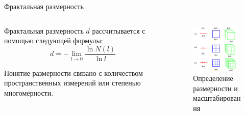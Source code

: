 \documentclass{beamer}
\begin{document}
\begin{frame}{Фрактальная размерность}

	\begin{columns}
		\begin{column}{0.5\textwidth}
			Фрактальная размерность $d$ рассчитывается с помощью следующей формулы:
			\[
				d = - \lim_{l \to 0} \frac{\ln {N(l)} }{\ln {l}}
			\]

			Понятие размерности связано с количеством пространственных измерений или степенью многомерности.
		\end{column}
		\begin{column}{0.5\textwidth}
			\begin{figure}
				\includegraphics[width=0.95\textwidth]{images/Fractal_dimension_example.png}
				\caption{Определение размерности и масштабирования}
			\end{figure}
		\end{column}
	\end{columns}

\end{frame}
\end{document}
